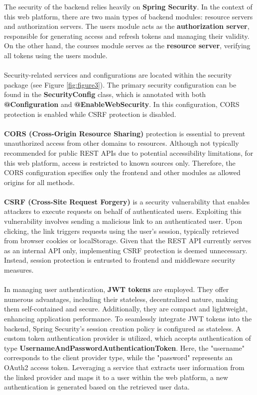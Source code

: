 The security of the backend relies heavily on \textbf{Spring Security}. In the context of this web platform, there are two main types of backend modules: resource servers and authorization servers. The users module acts as the \textbf{authorization server}, responsible for generating access and refresh tokens and managing their validity. On the other hand, the courses module serves as the \textbf{resource server}, verifying all tokens using the users module.
\\\\
\noindent Security-related services and configurations are located within the security package (see Figure \ref{fig:figure3}). The primary security configuration can be found in the \textbf{SecurityConfig} class, which is annotated with both \textbf{@Configuration} and \textbf{@EnableWebSecurity}. In this configuration, CORS protection is enabled while CSRF protection is disabled.
\\\\
\noindent \textbf{CORS (Cross-Origin Resource Sharing)} protection is essential to prevent unauthorized access from other domains to resources. Although not typically recommended for public REST APIs due to potential accessibility limitations, for this web platform, access is restricted to known sources only. Therefore, the CORS configuration specifies only the frontend and other modules as allowed origins for all methods.
\\\\
\noindent \textbf{CSRF (Cross-Site Request Forgery)} is a security vulnerability that enables attackers to execute requests on behalf of authenticated users. Exploiting this vulnerability involves sending a malicious link to an authenticated user. Upon clicking, the link triggers requests using the user's session, typically retrieved from browser cookies or localStorage. Given that the REST API currently serves as an internal API only, implementing CSRF protection is deemed unnecessary. Instead, session protection is entrusted to frontend and middleware security measures.
\\\\
\noindent In managing user authentication, \textbf{JWT tokens} are employed. They offer numerous advantages, including their stateless, decentralized nature, making them self-contained and secure. Additionally, they are compact and lightweight, enhancing application performance. To seamlessly integrate JWT tokens into the backend, Spring Security's session creation policy is configured as stateless. A custom token authentication provider is utilized, which accepts authentication of type \textbf{UsernameAndPasswordAuthenticationToken}. Here, the "username" corresponds to the client provider type, while the "password" represents an OAuth2 access token. Leveraging a service that extracts user information from the linked provider and maps it to a user within the web platform, a new authentication is generated based on the retrieved user data.

